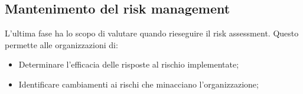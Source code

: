 \subsection{Mantenimento del risk management}
L'ultima fase ha lo scopo di valutare quando rieseguire il risk assessment. Questo permette alle organizzazioni di:
\begin{itemize}
    \item Determinare l'efficacia delle risposte al rischio implementate;
    \item Identificare cambiamenti ai rischi che minacciano l'organizzazione;
    
\end{itemize}
























